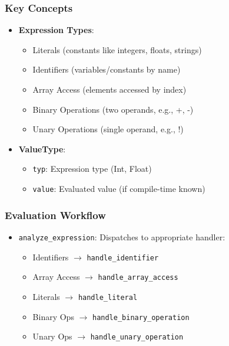 \documentclass[12pt,a4paper]{article}
\begin{document}
\subsubsection*{Key Concepts}
\begin{itemize}
	\item \textbf{Expression Types}:
	      \begin{itemize}
		      \item Literals (constants like integers, floats, strings)
		      \item Identifiers (variables/constants by name)
		      \item Array Access (elements accessed by index)
		      \item Binary Operations (two operands, e.g., +, -)
		      \item Unary Operations (single operand, e.g., !)
	      \end{itemize}

	\item \textbf{ValueType}:
	      \begin{itemize}
		      \item \texttt{typ}: Expression type (Int, Float)
		      \item \texttt{value}: Evaluated value (if compile-time known)
	      \end{itemize}
\end{itemize}

\subsubsection*{Evaluation Workflow}
\begin{itemize}
	\item \texttt{analyze\_expression}: Dispatches to appropriate handler:
	      \begin{itemize}
		      \item Identifiers $\rightarrow$ \texttt{handle\_identifier}
		      \item Array Access $\rightarrow$ \texttt{handle\_array\_access}
		      \item Literals $\rightarrow$ \texttt{handle\_literal}
		      \item Binary Ops $\rightarrow$ \texttt{handle\_binary\_operation}
		      \item Unary Ops $\rightarrow$ \texttt{handle\_unary\_operation}
	      \end{itemize}
\end{itemize}
\end{document}
